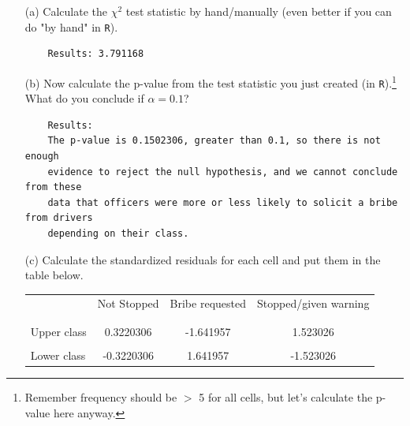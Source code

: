 \documentclass[12pt,letterpaper]{article}
\begin{document}
\begin{enumerate}
	
	\item [(a)]
	Calculate the $\chi^2$ test statistic by hand/manually (even better if you can do "by hand" in \texttt{R}).\\

	  
	
	\begin{verbatim} 
	Results: 3.791168
	\end{verbatim}	
	
	\vspace{1cm}	
	\item [(b)]
	Now calculate the p-value from the test statistic you just created (in \texttt{R}).\footnote{Remember frequency should be $>$ 5 for all cells, but let's calculate the p-value here anyway.}  What do you conclude if $\alpha = 0.1$?\\
	
	 
		
	\begin{verbatim} 
	Results: 
	The p-value is 0.1502306, greater than 0.1, so there is not enough 
	evidence to reject the null hypothesis, and we cannot conclude from these 
	data that officers were more or less likely to solicit a bribe from drivers 
	depending on their class.
	\end{verbatim}	
	
	\newpage
	\item [(c)] Calculate the standardized residuals for each cell and put them in the table below.
	\vspace{1cm}
	
	\begin{table}[h]
		\centering
		\begin{tabular}{l | c c c }
			& Not Stopped & Bribe requested & Stopped/given warning \\
			\\[-1.8ex] 
			\hline \\[-1.8ex]
			Upper class & 0.3220306 & -1.641957 & 1.523026 \\
			\\
			Lower class & -0.3220306 & 1.641957 & -1.523026 \\
			
		\end{tabular}
	\end{table}
	

\end{enumerate}
\end{document}

